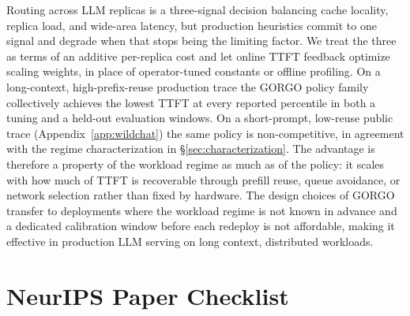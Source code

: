 \documentclass{article}
\begin{document}
Routing across LLM replicas is a three-signal decision balancing cache locality, replica
load, and wide-area latency, but production heuristics commit to one signal and
degrade when that stops being the limiting factor. We treat the three as
terms of an additive per-replica cost and let online TTFT feedback optimize 
scaling weights, in place of operator-tuned constants or offline profiling. On a
long-context, high-prefix-reuse production trace the GORGO policy family
collectively achieves the lowest TTFT at every reported percentile in both a
tuning and a held-out evaluation windows. On a short-prompt, low-reuse public
trace (Appendix~\ref{app:wildchat}) the same policy is non-competitive, in
agreement with the regime characterization in
\S\ref{sec:characterization}. The advantage is therefore a property of the
workload regime as much as of the policy: it scales with how much of TTFT is
recoverable through prefill reuse, queue avoidance, or network selection rather
than fixed by hardware. The design choices of GORGO transfer to
deployments where the workload regime is not known in advance and a dedicated
calibration window before each redeploy is not affordable, making it effective in production LLM serving on long context, distributed workloads. 




\newpage

\section*{NeurIPS Paper Checklist}
\end{document}
